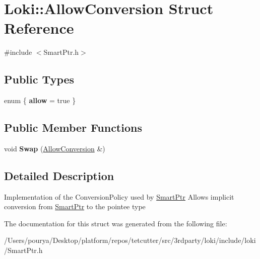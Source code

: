 \hypertarget{structLoki_1_1AllowConversion}{}\section{Loki\+:\+:Allow\+Conversion Struct Reference}
\label{structLoki_1_1AllowConversion}


{\ttfamily \#include $<$Smart\+Ptr.\+h$>$}

\subsection*{Public Types}
\begin{DoxyCompactItemize}
\item 
\hypertarget{structLoki_1_1AllowConversion_aa883f35c53f25f2ad4d4efa13538411e}{}enum \{ {\bfseries allow} = true
 \}\label{structLoki_1_1AllowConversion_aa883f35c53f25f2ad4d4efa13538411e}

\end{DoxyCompactItemize}
\subsection*{Public Member Functions}
\begin{DoxyCompactItemize}
\item 
\hypertarget{structLoki_1_1AllowConversion_aeb124aa9497f2923aaa4af08c25f1c23}{}void {\bfseries Swap} (\hyperlink{structLoki_1_1AllowConversion}{Allow\+Conversion} \&)\label{structLoki_1_1AllowConversion_aeb124aa9497f2923aaa4af08c25f1c23}

\end{DoxyCompactItemize}


\subsection{Detailed Description}
Implementation of the Conversion\+Policy used by \hyperlink{classLoki_1_1SmartPtr}{Smart\+Ptr} Allows implicit conversion from \hyperlink{classLoki_1_1SmartPtr}{Smart\+Ptr} to the pointee type 

The documentation for this struct was generated from the following file\+:\begin{DoxyCompactItemize}
\item 
/\+Users/pourya/\+Desktop/platform/repos/tetcutter/src/3rdparty/loki/include/loki/Smart\+Ptr.\+h\end{DoxyCompactItemize}
